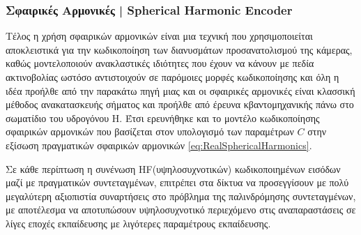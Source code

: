 \subsubsection{Σφαιρικές Αρμονικές | Spherical Harmonic Encoder} 
Τέλος η χρήση σφαιρικών αρμονικών είναι μια τεχνική που χρησιμοποιείται αποκλειστικά για την κωδικοποίηση των διανυσμάτων προσανατολισμού της κάμερας, καθώς μοντελοποιούν ανακλαστικές ιδιότητες που έχουν να κάνουν με πεδία ακτινοβολίας ωστόσο αντιστοιχούν σε παρόμοιες μορφές κωδικοποίησης και όλη η ιδέα προήλθε από την παρακάτω πηγή \cite{nuajSphericalHarmonicsPortalWakapon} μιας και οι σφαιρικές αρμονικές είναι κλασσική μέθοδος ανακατασκευής σήματος και προήλθε από έρευνα κβαντομηχανικής πάνω στο σωματίδιο του υδρογόνου H. Έτσι ερευνήθηκε και το μοντέλο κωδικοποίησης σφαιρικών αρμονικών που βασίζεται στον υπολογισμό των παραμέτρων $C$ στην εξίσωση πραγματικών σφαιρικών αρμονικών  \ref{eq:RealSphericalHarmonics}.

Σε κάθε περίπτωση η συνένωση HF(υψηλοσυχνοτικών) κωδικοποιημένων εισόδων μαζί με πραγματικών συντεταγμένων, επιτρέπει στα δίκτυα να προσεγγίσουν με πολύ μεγαλύτερη αξιοπιστία συναρτήσεις στο πρόβλημα της παλινδρόμησης συντεταγμένων, με αποτέλεσμα να αποτυπώσουν υψηλοσυχνοτικό περιεχόμενο στις αναπαραστάσεις σε λίγες εποχές εκπαίδευσης με λιγότερες παραμέτρους εκπαίδευσης.